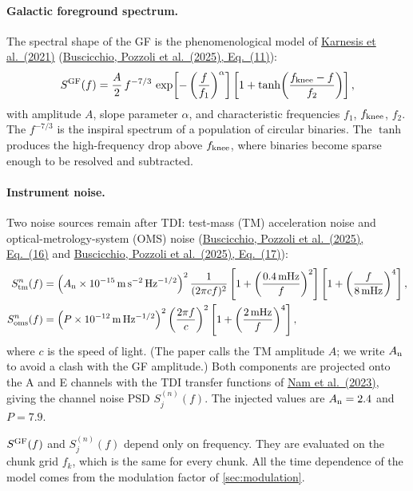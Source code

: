 \documentclass[11pt,a4paper]{article}
\newcommand{\urlPone}{https://arxiv.org/pdf/2511.03604}
\newcommand{\PoneEq}[1]{\href{\urlPone}{Buscicchio, Pozzoli et al.~(2025), Eq.~(#1)}}
\begin{document}
\paragraph{Galactic foreground spectrum.} The spectral shape of the GF is the
phenomenological model of \href{https://arxiv.org/abs/2103.14598}{Karnesis et al.~(2021)}
(\PoneEq{11}):
\begin{equation}
  S^{\rm GF}(f) = \frac{A}{2}\, f^{-7/3}\,
  \exp\!\left[-\left(\frac{f}{f_1}\right)^{\alpha}\right]
  \left[1+\tanh\!\left(\frac{f_{\rm knee}-f}{f_2}\right)\right],
  \label{eq:sgf}
\end{equation}
with amplitude $A$, slope parameter $\alpha$, and characteristic frequencies
$f_1$, $f_{\rm knee}$, $f_2$. The $f^{-7/3}$ is the inspiral spectrum of a
population of circular binaries. The $\tanh$ produces the high-frequency drop above
$f_{\rm knee}$, where binaries become sparse enough to be resolved and subtracted.

\paragraph{Instrument noise.} Two noise sources remain after TDI: test-mass (TM)
acceleration noise and optical-metrology-system (OMS) noise (\PoneEq{16} and
\PoneEq{17}):
\begin{align}
  S^n_{\rm tm}(f) &= \left(A_{\rm n}\times10^{-15}\,\mathrm{m\,s^{-2}\,Hz^{-1/2}}\right)^2
  \frac{1}{(2\pi c f)^2}
  \left[1+\left(\frac{0.4\,\mathrm{mHz}}{f}\right)^2\right]
  \left[1+\left(\frac{f}{8\,\mathrm{mHz}}\right)^4\right], \label{eq:tm}\\
  S^n_{\rm oms}(f) &= \left(P\times10^{-12}\,\mathrm{m\,Hz^{-1/2}}\right)^2
  \left(\frac{2\pi f}{c}\right)^2
  \left[1+\left(\frac{2\,\mathrm{mHz}}{f}\right)^4\right], \label{eq:oms}
\end{align}
where $c$ is the speed of light. (The paper calls the TM amplitude $A$; we write
$A_{\rm n}$ to avoid a clash with the GF amplitude.) Both components are projected
onto the A and E channels with the TDI transfer functions of
\href{https://arxiv.org/abs/2211.02539}{Nam et al.~(2023)}, giving the channel noise
PSD $S^{(n)}_{j}(f)$. The injected values are $A_{\rm n}=2.4$ and $P=7.9$.

\begin{keybox}
$S^{\rm GF}(f)$ and $S^{(n)}_j(f)$ depend only on frequency. They are evaluated on
the chunk grid $f_k$, which is the same for every chunk. All the time dependence of
the model comes from the modulation factor of \cref{sec:modulation}.
\end{keybox}
\end{document}
